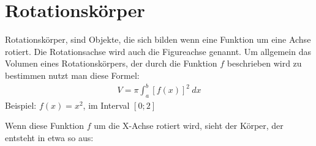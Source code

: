 \section{Rotationskörper}

\begin{flushleft}
    Rotationskörper, sind Objekte, die sich bilden wenn eine Funktion um eine Achse rotiert.
    Die Rotationsachse wird auch die Figureachse genannt.
    Um allgemein das Volumen eines Rotationskörpers, der durch die Funktion $f$ beschrieben wird zu bestimmen nutzt man diese Formel:
    \begin{align}
        V=\pi\int_{a}^{b}\left[f(x)\right]^2 \ dx
    \end{align}
    Beispiel: $f(x)=x^2$, im Interval $[0;2]$
\end{flushleft}

\begin{center}
\end{center}

\begin{flushleft}
    Wenn diese Funktion $f$ um die X-Achse rotiert wird, sieht der Körper, der entsteht in etwa so aus:
\end{flushleft}

